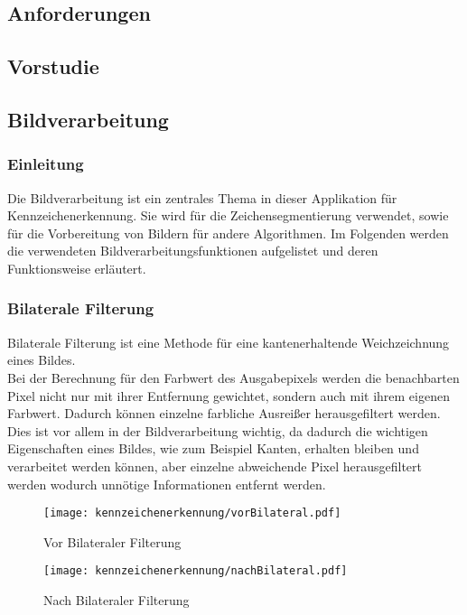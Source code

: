 \def \sectionauthors {Samuel Bleiner}
\subsection{Anforderungen}
\lipsum[1-5]
\subsection{Vorstudie}
\lipsum[1-5]

\subsection{Bildverarbeitung}

\subsubsection{Einleitung}
Die Bildverarbeitung ist ein zentrales Thema in dieser Applikation für Kennzeichenerkennung. 
Sie wird für die Zeichensegmentierung verwendet, sowie für die Vorbereitung von Bildern für 
andere Algorithmen. Im Folgenden werden die verwendeten Bildverarbeitungsfunktionen aufgelistet 
und deren Funktionsweise erläutert.

\subsubsection{Bilaterale Filterung}
Bilaterale Filterung ist eine Methode für eine kantenerhaltende Weichzeichnung eines Bildes.\\

Bei der Berechnung für den Farbwert des Ausgabepixels werden die benachbarten Pixel nicht nur 
mit ihrer Entfernung gewichtet, sondern auch mit ihrem eigenen Farbwert. Dadurch können einzelne 
farbliche Ausreißer herausgefiltert werden. Dies ist vor allem in der Bildverarbeitung wichtig, 
da dadurch die wichtigen Eigenschaften eines Bildes, wie zum Beispiel Kanten, erhalten bleiben 
und verarbeitet werden können, aber einzelne abweichende Pixel herausgefiltert werden wodurch 
unnötige Informationen entfernt werden.\\ 

\begin{figure}[htbp]
    \centering
    \begin{minipage}[t]{0.45\linewidth}
        \centering
        \texttt{[image: kennzeichenerkennung/vorBilateral.pdf]}
        \caption{Vor Bilateraler Filterung}
        \label{vorBi}
    \end{minipage}
    \hfill
    \begin{minipage}[t]{0.45\linewidth}
        \centering
        \texttt{[image: kennzeichenerkennung/nachBilateral.pdf]}
        \caption{Nach Bilateraler Filterung}
        \label{nachBi}
    \end{minipage}
\end{figure}

